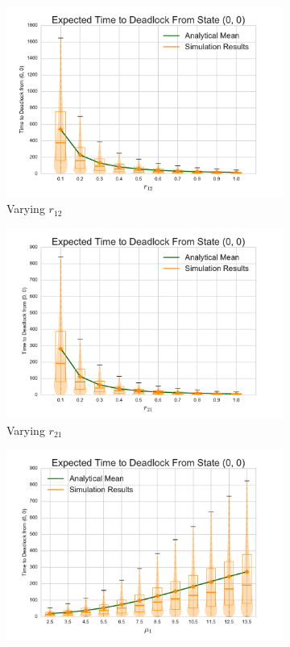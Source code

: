 \documentclass{article}
\numberwithin{equation}{section}
\begin{document}
\begin{center}
\begin{figure}[!htbp]
\begin{center}
\begin{subfigure}[b]{0.38\textwidth}
  \includegraphics[width=\textwidth]{images/varyr12}
  \caption{Varying $r_{12}$}
  \label{fig:timestodeadlock2_r12}
\end{subfigure}
\begin{subfigure}[b]{0.38\textwidth}
  \includegraphics[width=\textwidth]{images/varyr21}
  \caption{Varying $r_{21}$}
  \label{fig:timestodeadlock2_r21}
\end{subfigure}
\begin{subfigure}[b]{0.38\textwidth}
  \includegraphics[width=\textwidth]{images/varymu1}

\end{subfigure}
\end{center}
\end{figure}
\end{center}
\end{document}
